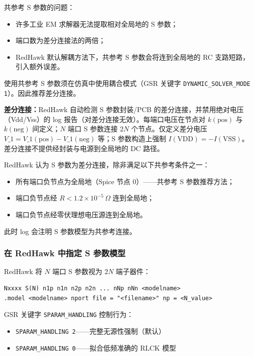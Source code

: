 
共参考 S 参数的问题：
\begin{itemize}
  \item 许多工业 EM 求解器无法提取相对全局地的 S 参数；
  \item 端口数为差分连接法的两倍；
  \item RedHawk 默认解耦方法下，共参考 S 参数会将连到全局地的 RC 支路短路，引入额外误差。
\end{itemize}
使用共参考 S 参数须在仿真中使用耦合模式（GSR 关键字 \texttt{DYNAMIC\_SOLVER\_MODE 1}）。因此推荐差分连接。

\textbf{差分连接：}RedHawk 自动检测 S 参数封装/PCB 的差分连接，并禁用绝对电压（Vdd/Vss）的 log 报告（对差分连接无效）。每端口电压在节点对 $k(\mathrm{pos})$ 与 $k(\mathrm{neg})$ 间定义；$N$ 端口 S 参数连接 $2N$ 个节点。仅定义差分电压 $V\_1 = V\_1(\mathrm{pos})-V\_1(\mathrm{neg})$ 等；S 参数构造上强制 $I(\mathrm{VDD})=-I(\mathrm{VSS})$。差分连接不提供经封装与电源到全局地的 DC 路径。


RedHawk 认为 S 参数为差分连接，除非满足以下共参考条件之一：
\begin{itemize}
  \item 所有端口负节点为全局地（Spice 节点 0）——共参考 S 参数推荐方法；
  \item 端口负节点经 $R < 1.2\times 10^{-5}\,\Omega$ 连到全局地；
  \item 端口负节点经零伏理想电压源连到全局地。
\end{itemize}
此时 log 会注明 S 参数模型为共参考连接。

\subsubsection{在 RedHawk 中指定 S 参数模型}
RedHawk 将 $N$ 端口 S 参数视为 $2N$ 端子器件：
\begin{lstlisting}
Nxxxx S(N) n1p n1n n2p n2n ... nNp nNn <modelname>
.model <modelname> nport file = "<filename>" np = <N_value>
\end{lstlisting}


GSR 关键字 \texttt{SPARAM\_HANDLING} 控制行为：
\begin{itemize}
  \item \texttt{SPARAM\_HANDLING 2}——完整无源性强制（默认）
  \item \texttt{SPARAM\_HANDLING 0}——拟合低频准确的 RLCK 模型
\end{itemize}

